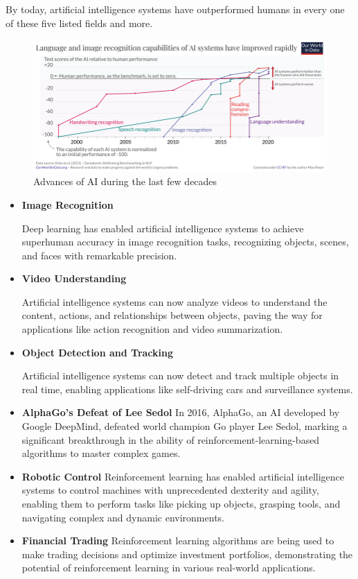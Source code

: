 \documentclass[masterthesis]{fer}
\begin{document}
By today, artificial intelligence systems have outperformed humans in every one of these five listed fields and more.
\begin{figure}[htb]
  \centering
  \includegraphics[width=1\linewidth]{Figures/AI performance history.png} 
  \caption{Advances of AI during the last few decades}
  \label{slk:AI_advances}
\end{figure}
\begin{itemize}
    \item \textbf{Image Recognition}
    
    Deep learning has enabled artificial intelligence systems
    to achieve superhuman accuracy in image recognition tasks,
    recognizing objects, scenes, and faces with remarkable precision.

    \item \textbf{Video Understanding}
    
    Artificial intelligence systems can now
    analyze videos to understand the content, actions, and relationships between objects,
    paving the way for applications like action recognition and video summarization.

    \item \textbf{Object Detection and Tracking}
    
    Artificial intelligence systems can now
    detect and track multiple objects in real time,
    enabling applications like self-driving cars and surveillance systems.
    \item \textbf{AlphaGo's Defeat of Lee Sedol} In 2016, AlphaGo, an AI developed by Google DeepMind, defeated world champion Go player Lee Sedol, marking a significant breakthrough in the ability of reinforcement-learning-based algorithms to master complex games.
    \item \textbf{Robotic Control} Reinforcement learning has enabled artificial intelligence systems to control machines with unprecedented dexterity and agility, enabling them to perform tasks like picking up objects, grasping tools, and navigating complex and dynamic environments.
    \item \textbf{Financial Trading} Reinforcement learning algorithms are being used to make trading decisions and optimize investment portfolios, demonstrating the potential of reinforcement learning in various real-world applications.
\end{itemize}
\end{document}
